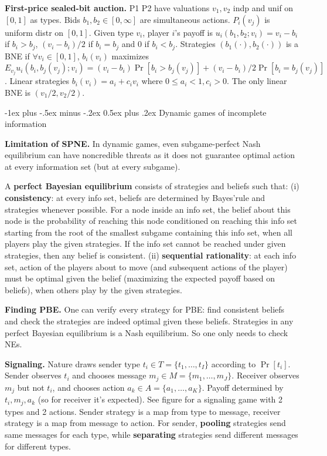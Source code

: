 \documentclass[a4paper,11pt,landscape]{article}
\makeatletter
\renewcommand{\section}{\@startsection{section}{1}{0mm}%
                                {-1ex plus -.5ex minus -.2ex}%
                                {0.5ex plus .2ex}%
                                {\normalfont\large\bfseries}}
\makeatother
\begin{document}
\begin{multicols*}{3}
\textbf{First-price sealed-bit auction.} P1 P2 have valuations $v_1,v_2$ indp and unif on $[0,1]$ as types. Bids $b_1,b_2\in[0,\infty]$ are simultaneous actions. $P_i(v_j)$ is uniform distr on $[0,1]$. Given type $v_i$, player $i$'s payoff is $u_i(b_1,b_2;v_i)=v_i-b_i$ if $b_i>b_j$, $(v_i-b_i)/2$ if $b_i=b_j$ and $0$ if $b_i<b_j$. Strategies $(b_1(\cdot),b_2(\cdot))$ is a BNE if $\forall v_i\in[0,1]$, $b_i(v_i)$ maximizes $E_{v_j} u_i(b_i,b_j(v_j);v_i)=(v_i-b_i)\Pr[b_i>b_j(v_j)]\allowbreak+\allowbreak(v_i-b_i)/2\allowbreak\Pr[b_i=b_j(v_j)]$. Linear strategies $b_i(v_i)=a_i+c_iv_i$ where $0\leq a_i<1,c_i>0$. The only linear BNE is $(v_1/2,v_2/2)$.


\section{Dynamic games of incomplete information}

\textbf{Limitation of SPNE.} In dynamic games, even subgame-perfect Nash equilibrium can have noncredible threats as it does not guarantee optimal action at every information set (but at every subgame).

A \textbf{perfect Bayesian equilibrium} consists of strategies and beliefs such that: (i) \textbf{consistency}: at every info set, beliefs are determined by Bayes'rule and strategies whenever possible. For a node inside an info set, the belief about this node is the probability of reaching this node conditioned on reaching this info set starting from the root of the smallest subgame containing this info set, when all players play the given strategies. If the info set cannot be reached under given strategies, then any belief is consistent. (ii) \textbf{sequential rationality}: at each info set, action of the players about to move (and subsequent actions of the player) must be optimal given the belief (maximizing the expected payoff based on beliefs), when others play by the given strategies.

\textbf{Finding PBE.} One can verify every strategy for PBE: find consistent beliefs and check the strategies are indeed optimal given these beliefs. Strategies in any perfect Bayesian equilibrium is a Nash equilibrium. So one only needs to check NEs.

\textbf{Signaling.} Nature draws sender type $t_i\in T=\{t_1,\ldots,t_I\}$ according to $\Pr[t_i]$. Sender observes $t_i$ and chooses message $m_j\in M=\{m_1,\ldots,\allowbreak m_J\}$. Receiver observes $m_j$ but not $t_i$, and chooses action $a_k\in A=\{\allowbreak a_1,\ldots,a_K\}$. Payoff determined by $t_i,m_j,a_k$ (so for receiver it's expected). See figure for a signaling game with 2 types and 2 actions. Sender strategy is a map from type to message, receiver strategy is a map from message to action. For sender, \textbf{pooling} strategies send same messages for each type, while \textbf{separating} strategies send different messages for different types.


\end{multicols*}
\end{document}
